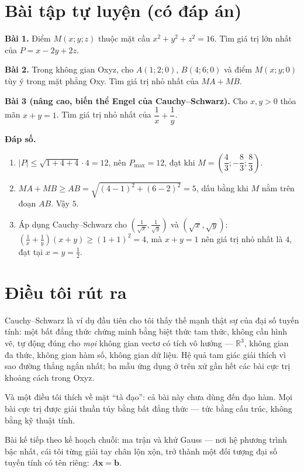 \documentclass[12pt,a4paper]{article}
\begin{document}
\section{Bài tập tự luyện (có đáp án)}

\textbf{Bài 1.} Điểm $M(x;y;z)$ thuộc mặt cầu $x^2+y^2+z^2=16$. Tìm giá trị lớn nhất của $P = x - 2y + 2z$.

\textbf{Bài 2.} Trong không gian Oxyz, cho $A(1;2;0)$, $B(4;6;0)$ và điểm $M(x;y;0)$ tùy ý trong mặt phẳng Oxy. Tìm giá trị nhỏ nhất của $MA + MB$.

\textbf{Bài 3 (nâng cao, biến thể Engel của Cauchy--Schwarz).} Cho $x, y > 0$ thỏa mãn $x+y=1$. Tìm giá trị nhỏ nhất của $\dfrac{1}{x}+\dfrac{1}{y}$.

\textbf{Đáp số.}

\begin{enumerate}
  \item $|P| \le \sqrt{1+4+4}\cdot 4 = 12$, nên $P_{\max}=12$, đạt khi $M=\left(\dfrac{4}{3};-\dfrac{8}{3};\dfrac{8}{3}\right)$.
  \item $MA+MB \ge AB = \sqrt{(4-1)^2+(6-2)^2} = 5$, dấu bằng khi $M$ nằm trên đoạn $AB$. Vậy $5$.
  \item Áp dụng Cauchy--Schwarz cho $(\tfrac{1}{\sqrt{x}},\tfrac{1}{\sqrt{y}})$ và $(\sqrt{x},\sqrt{y})$:
        $\left(\tfrac{1}{x}+\tfrac{1}{y}\right)(x+y) \ge (1+1)^2 = 4$, mà $x+y=1$ nên giá trị nhỏ nhất là $4$, đạt tại $x=y=\tfrac12$.
\end{enumerate}

\section{Điều tôi rút ra}

Cauchy--Schwarz là ví dụ đầu tiên cho tôi thấy thế mạnh thật sự của đại số tuyến tính: một bất đẳng thức chứng minh bằng biệt thức tam thức, không cần hình vẽ, tự động đúng cho \emph{mọi} không gian vectơ có tích vô hướng --- $\mathbb{R}^3$, không gian đa thức, không gian hàm số, không gian dữ liệu. Hệ quả tam giác giải thích vì sao đường thẳng ngắn nhất; ba mẫu ứng dụng ở trên xử gần hết các bài cực trị khoảng cách trong Oxyz.

Và một điều tôi thích về mặt ``tà đạo'': cả bài này chưa dùng đến đạo hàm. Mọi bài cực trị được giải thuần túy bằng bất đẳng thức --- tức bằng cấu trúc, không bằng kỹ thuật tính.

Bài kế tiếp theo kế hoạch chuỗi: ma trận và khử Gauss --- nơi hệ phương trình bậc nhất, cái tôi từng giải tay chân lộn xộn, trở thành một đối tượng đại số tuyến tính có tên riêng: $A\mathbf{x} = \mathbf{b}$.
\end{document}
